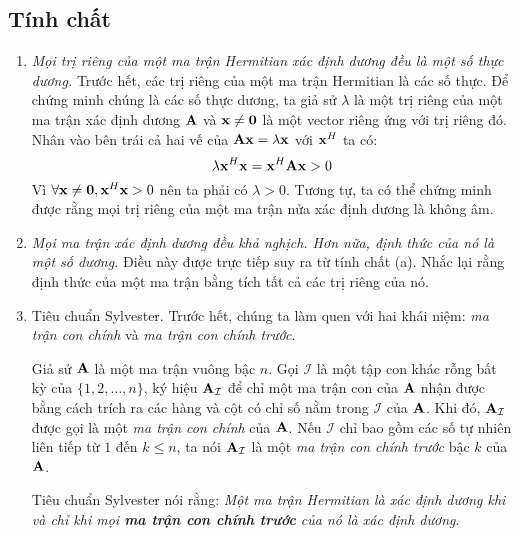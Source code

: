 \subsection{Tính chất} %
\label{sub:tinh_chat}
\begin{enumerate}

\item \textit{Mọi trị riêng của một ma trận Hermitian xác định dương đều là một số
thực dương.}  Trước hết, các trị riêng của một ma trận Hermitian là các số
thực. Để chứng minh chúng là các số thực dương, ta giả sử $\lambda$ là một
trị riêng của một ma trận xác định dương $\mathbf{A}$ và $\mathbf{x} \neq \mathbf{0}$ là
một vector riêng ứng với trị riêng đó. Nhân vào bên trái cả hai vế của
$\mathbf{A}\mathbf{x} = \lambda \mathbf{x}$ với $\mathbf{x}^H$ ta có:
\begin{equation}
\lambda \mathbf{x}^H \mathbf{x} = \mathbf{x}^H \mathbf{A} \mathbf{x} > 0
\end{equation}
Vì $\forall \mathbf{x} \neq \mathbf{0}, \mathbf{x}^H\mathbf{x} > 0$ nên ta phải có $\lambda > 0$. Tương
tự, ta có thể chứng minh được rằng mọi trị riêng của một ma trận
nửa xác định dương là không âm.


\item \textit{Mọi ma trận xác định dương đều khả nghịch. Hơn nữa, định thức
của nó là một số dương.}  Điều này được trực tiếp suy ra từ tính chất (a).
Nhắc lại rằng định thức của một ma trận bằng tích tất cả các trị riêng của
nó.


\def\AI{\bA_{\mathcal{I}}}
\item Tiêu chuẩn Sylvester. Trước hết, chúng ta làm quen với hai khái niệm:
\textit{ma trận con chính} và \textit{ma trận con chính trước}.

Giả sử $\mathbf{A}$ là một ma trận vuông bậc $n$. Gọi $\mathcal{I}$ là một tập con
khác rỗng bất kỳ của $\{1, 2, \dots, n\}$, ký hiệu $\AI$ để chỉ một ma trận
con của $\mathbf{A}$ nhận được bằng cách trích ra các hàng và cột có chỉ số nằm
trong $\mathcal{I}$ của $\mathbf{A}$. Khi đó, $\AI$ được gọi là một \textit{ma trận
con chính} của $\mathbf{A}$. Nếu $\mathcal{I}$ chỉ bao gồm các số tự nhiên liên
tiếp từ $1$ đến $k \leq  n$, ta nói $\AI$ là một \textit{ma trận con chính
trước} bậc $k$ của $\mathbf{A}$.

Tiêu chuẩn Sylvester nói rằng: \textit{Một ma trận Hermitian là xác định dương khi và chỉ khi mọi \textbf{ma trận con chính trước} của nó là xác định dương}.


\end{enumerate}
